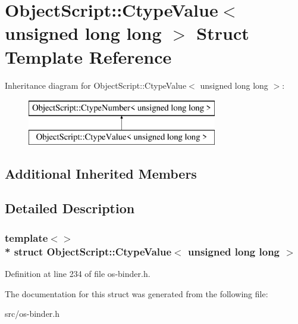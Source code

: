 \hypertarget{struct_object_script_1_1_ctype_value_3_01unsigned_01long_01long_01_4}{}\section{Object\+Script\+:\+:Ctype\+Value$<$ unsigned long long $>$ Struct Template Reference}
\label{struct_object_script_1_1_ctype_value_3_01unsigned_01long_01long_01_4}
Inheritance diagram for Object\+Script\+:\+:Ctype\+Value$<$ unsigned long long $>$\+:\begin{figure}[H]
\begin{center}
\leavevmode
\includegraphics[height=2.000000cm]{struct_object_script_1_1_ctype_value_3_01unsigned_01long_01long_01_4}
\end{center}
\end{figure}
\subsection*{Additional Inherited Members}


\subsection{Detailed Description}
\subsubsection*{template$<$$>$\\*
struct Object\+Script\+::\+Ctype\+Value$<$ unsigned long long $>$}



Definition at line 234 of file os-\/binder.\+h.



The documentation for this struct was generated from the following file\+:\begin{DoxyCompactItemize}
\item 
src/os-\/binder.\+h\end{DoxyCompactItemize}
